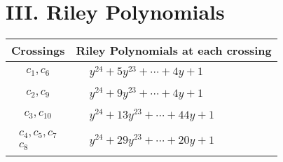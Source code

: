 \documentclass[1p]{elsarticle_modified}
\theoremstyle{definition}
\begin{document}
\centering \section*{ III. Riley Polynomials}
\begin{tabular}{m{50pt}|m{274pt}}
Crossings & \hspace{64pt}Riley Polynomials at each crossing \\
\hline $$\begin{aligned}c_{1},c_{6}\end{aligned}$$&$\begin{aligned}
&y^{24}+5 y^{23}+\cdots+4 y+1
\end{aligned}$\\
\hline $$\begin{aligned}c_{2},c_{9}\end{aligned}$$&$\begin{aligned}
&y^{24}+9 y^{23}+\cdots+4 y+1
\end{aligned}$\\
\hline $$\begin{aligned}c_{3},c_{10}\end{aligned}$$&$\begin{aligned}
&y^{24}+13 y^{23}+\cdots+44 y+1
\end{aligned}$\\
\hline $$\begin{aligned}c_{4},c_{5},c_{7}\\c_{8}\end{aligned}$$&$\begin{aligned}
&y^{24}+29 y^{23}+\cdots+20 y+1
\end{aligned}$\\
\hline
\end{tabular}
\vskip 2pc
\end{document}

